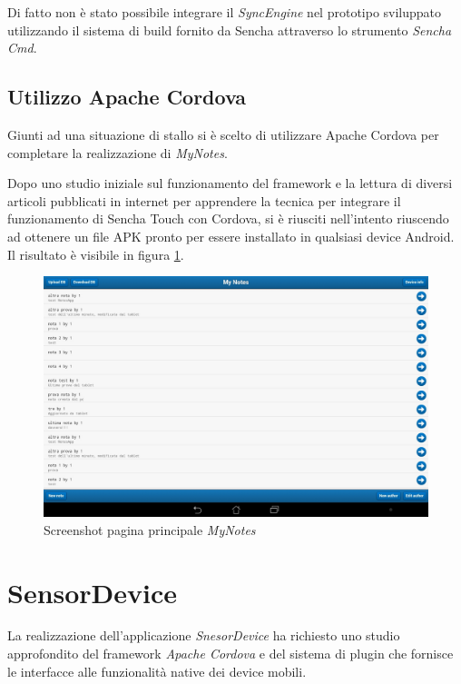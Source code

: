Di fatto non è stato possibile integrare il \emph{SyncEngine} nel prototipo sviluppato utilizzando il sistema di build fornito da Sencha attraverso lo strumento \emph{Sencha Cmd}.

\subsection{Utilizzo Apache Cordova}
Giunti ad una situazione di stallo si è scelto di utilizzare Apache Cordova per completare la realizzazione di \emph{MyNotes}.

Dopo uno studio iniziale sul funzionamento del framework \cite{apache:cordova} e la lettura di diversi articoli pubblicati in internet \cite{andidog:packageSenchaPhonegap} \cite{sencha:senchaMVCphonegap} \cite{bgmemo:senchaPhonegap} per apprendere la tecnica per integrare il funzionamento di Sencha Touch con Cordova, si è riusciti nell'intento riuscendo ad ottenere un file \ac{APK} pronto per essere installato in qualsiasi device Android.
Il risultato è visibile in figura \ref{fig:screenshot mynotes}.

\begin{figure}[htb]
\centering
\includegraphics[scale=0.25]{gfx/screenshot/screen_MyNotes}
\caption{Screenshot pagina principale \emph{MyNotes}}
\label{fig:screenshot mynotes}
\end{figure}

\section{SensorDevice}
La realizzazione dell'applicazione \emph{SnesorDevice} ha richiesto uno studio approfondito del framework \emph{Apache Cordova} \cite{apache:cordova} e del sistema di plugin che fornisce le interfacce alle funzionalità native dei device mobili.

